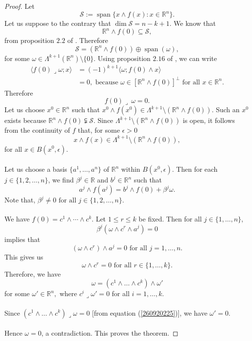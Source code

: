 \documentclass[11pt, a4paper, reqno]{amsart}
\numberwithin{equation}{section}
\newcommand{\spann}{\operatorname{span}}
\begin{document}
\begin{proof} 
Let $$\mathcal S:=\spann\{x\wedge f(x):x\in \mathbb R^n \}.$$
Let us suppose to the contrary that $\dim \mathcal S=n-k+1.$  We know that 
\begin{equation}\label{260920221}
\mathbb R^n \wedge f(0)\subseteq \mathcal S,
\end{equation}
from proposition  $2.2$ of \cite{bandyopadhyay2015some}. Therefore $$\mathcal S=\left(\mathbb R^n \wedge f(0)\right)\oplus \spann (\omega ),$$ 
for some $\omega \in \Lambda^{k+1}(\mathbb R^n)\setminus \{0\}$.  
Using proposition $2.16$ of \cite{csato2011pullback}, we can write
\begin{align*}
\langle f(0)\lrcorner \omega; x\rangle &=(-1)^{k+1}\langle \omega; f(0)\wedge x\rangle\\
&=0, \textrm{ because }\omega \in \left[\mathbb R^n\wedge f(0)\right]^{\perp}\textrm{ for all }x\in \mathbb R^n.
\end{align*}
Therefore 
\begin{equation}\label{260920225}
f(0)\lrcorner \  \omega =0.
\end{equation}
Let us choose $x^0\in \mathbb R^n$ such that $x^0\wedge f(x^0)\in \Lambda^{k+1}\setminus (\mathbb R^n\wedge f(0))$. Such an $x^0$ exists because $\mathbb R^n \wedge f(0)\subsetneqq \mathcal S$.
Since $\Lambda^{k+1}\setminus (\mathbb R^n \wedge f(0))$ is open, it follows from the continuity of $f$ that, for some $\epsilon >0$ $$x\wedge f(x)\in \Lambda^{k+1}\setminus (\mathbb R^n \wedge f(0)), $$
for all $x\in B(x^0,\epsilon).$\\
\\
Let us choose a basis $\{a^1,\ldots,a^n\}$ of $\mathbb R^n$ within $B(x^0,\epsilon)$. Then for each $j\in \{1,2,\ldots,n\}$, we find $\beta^j\in \mathbb R$ and $b^j\in \mathbb R^n$ such that $$a^j\wedge f(a^j)=b^j\wedge f(0)+\beta^j\omega.$$
Note that, $\beta^j\neq 0 \textrm{ for all }j\in \{1,2,\ldots,n\}.$\\
\\
We have $f(0)=c^1\wedge \cdots \wedge c^k$. Let $1\leq r\leq k$ be fixed. Then for all $j\in \{1,\ldots, n\}$, $$\beta^j (\omega \wedge c^r\wedge a^j)=0$$ 
implies that $$(\omega \wedge c^r)\wedge a^j=0 \textrm{ for all }j=1,\ldots, n.$$
This gives us $$\omega \wedge c^r=0 \textrm{ for all }r\in \{1,\ldots ,k\}.$$
Therefore, we have $$\omega =(c^1\wedge \ldots \wedge c^k)\wedge \omega'$$
for some $\omega'\in \mathbb R^n,$ where $c^i\lrcorner\omega'=0$ for all $i=1,\ldots, k.$ \\
\\
Since $(c^1\wedge \ldots \wedge c^k)\lrcorner \omega =0$ [from equation (\ref{260920225})], we have $\omega'=0$. \\
\\
Hence $\omega=0$, a contradiction. This proves the theorem.
\end{proof}
\end{document}

